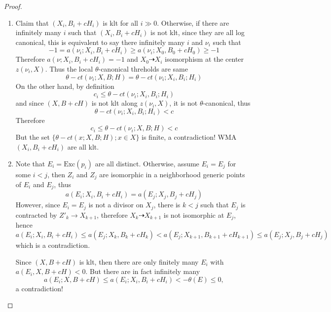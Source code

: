 \documentclass{article}
\begin{document}
\begin{proof}
\begin{enumerate}[Step 1]
Furthermore, by decresing of canonical divisor, we have
$$ a(\nu;X_i,B_i+cH_i)\leqslant a(\nu;X,B+cH) $$
and strictly inequality holds iff $ X_l\dashrightarrow X_{l+1} $ is not an isomorphism at center of $ \nu $ on $ X_l $ for some $ l<i $
\item Claim that $ (X_i,B_i+cH_i) $ is klt for all $ i\gg 0 $. Otherwise, if there are infinitely many $ i $ such that $ (X_i,B_i+cH_i) $ is not klt, since they are all log canonical, this is equivalent to say there infinitely many $ i $ and $ \nu_i $ such that
$$ -1=a(\nu_i;X_i,B_i+cH_i)\geqslant a(\nu_i;X_0,B_0+cH_0)\geqslant -1  $$
Therefore $ a(\nu;X_i,B_i+cH_i)=-1 $ and $ X_0\dashrightarrow X_i $ isomorphism at the center $ z(\nu_i,X) $. Thus the local $ \theta $-canonical threholds are same
$$ \theta-ct(\nu_i;X,B;H)=\theta-ct(\nu_i;X_i,B_i;H_i) $$
On the other hand, by definition
$$ c_i \leqslant \theta-ct(\nu_i;X_i,B_i;H_i) $$
and since $ (X,B+cH) $ is not klt along $ z(\nu_i,X) $, it is not $ \theta $-canonical, thus
$$ \theta-ct(\nu_i;X_i,B_i;H_i)<c $$
Therefore
$$ c_i\leqslant \theta-ct(\nu_i;X,B;H)<c $$
But the set $\{ \theta-ct(x;X,B;H);x\in X\} $ is finite, a contradiction! WMA $ (X_i,B_i+cH_i) $ are all klt.
\item Note that $ E_i=\mathrm{Exc}(p_i) $ are all distinct. Otherwise, assume $ E_i=E_j $ for some $ i<j $, then $ Z_i $ and $ Z_j $ are isomorphic in a neighborhood generic points of $ E_i $ and $ E_j $, thus
$$ a(E_i;X_i,B_i+cH_i)=a(E_j;X_j,B_j+cH_j) $$
However, since $ E_i=E_j $ is not a divisor on $ X_j $, there is $ k<j $ such that $ E_j $ is contracted by $ Z'_k\to X_{k+1} $, therefore $ X_k\dashrightarrow X_{k+1} $ is not isomorphic at $ E_j $, hence
$$ a(E_i;X_i,B_i+cH_i)\leqslant a(E_j;X_k,B_k+cH_k)<a(E_j;X_{k+1},B_{k+1}+cH_{k+1})\leqslant a(E_j;X_j,B_j+cH_j) $$
which is a contradiction.

Since $ (X,B+cH) $ is klt, then there are only finitely many $ E_i $ with $ a(E_i,X,B+cH)<0 $. But there are in fact infinitely many
$$ a(E_i;X,B+cH)\leqslant  a(E_i;X_i,B_i+cH_i)<-\theta (E)\leqslant 0 ,$$
a contradiction!
\end{enumerate}
\end{proof}
\end{document}
